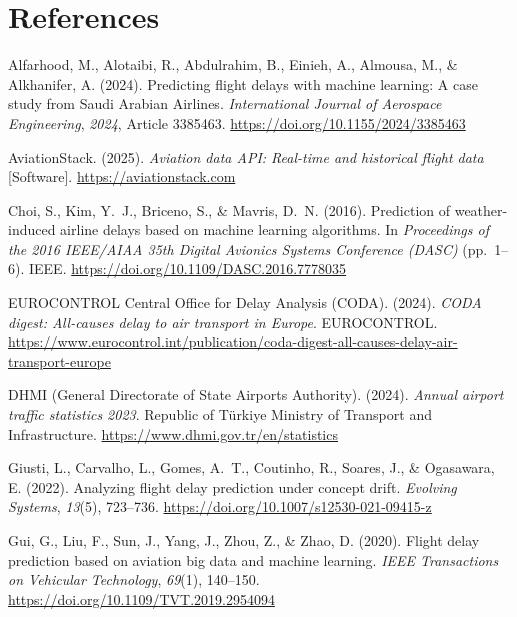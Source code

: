 \documentclass{report}
\begin{document}
\chapter*{References}

\begin{list}{}{%
  \setlength{\leftmargin}{1.5em}%
  \setlength{\itemindent}{-1.5em}%
  \setlength{\itemsep}{6pt}%
  \setlength{\parsep}{0pt}%
  \setlength{\topsep}{0pt}%
}

\item Alfarhood, M., Alotaibi, R., Abdulrahim, B., Einieh, A., Almousa, M., \& Alkhanifer, A. (2024).
Predicting flight delays with machine learning: A case study from Saudi Arabian Airlines.
\textit{International Journal of Aerospace Engineering}, \textit{2024}, Article 3385463.
\url{https://doi.org/10.1155/2024/3385463}

\item AviationStack. (2025). \textit{Aviation data API: Real-time and historical flight data}
[Software]. \url{https://aviationstack.com}

\item Choi, S., Kim, Y.\ J., Briceno, S., \& Mavris, D.\ N. (2016).
Prediction of weather-induced airline delays based on machine learning algorithms.
In \textit{Proceedings of the 2016 IEEE/AIAA 35th Digital Avionics Systems Conference (DASC)}
(pp.\ 1--6). IEEE.
\url{https://doi.org/10.1109/DASC.2016.7778035}

\item EUROCONTROL Central Office for Delay Analysis (CODA). (2024).
\textit{CODA digest: All-causes delay to air transport in Europe}.
EUROCONTROL.
\url{https://www.eurocontrol.int/publication/coda-digest-all-causes-delay-air-transport-europe}

\item DHMI (General Directorate of State Airports Authority). (2024).
\textit{Annual airport traffic statistics 2023}. Republic of
T\"{u}rkiye Ministry of Transport and Infrastructure.
\url{https://www.dhmi.gov.tr/en/statistics}


\item Giusti, L., Carvalho, L., Gomes, A.\ T., Coutinho, R., Soares, J., \& Ogasawara, E. (2022).
Analyzing flight delay prediction under concept drift.
\textit{Evolving Systems}, \textit{13}(5), 723--736.
\url{https://doi.org/10.1007/s12530-021-09415-z}

\item Gui, G., Liu, F., Sun, J., Yang, J., Zhou, Z., \& Zhao, D. (2020).
Flight delay prediction based on aviation big data and machine learning.
\textit{IEEE Transactions on Vehicular Technology}, \textit{69}(1), 140--150.
\url{https://doi.org/10.1109/TVT.2019.2954094}


\end{list}
\end{document}
